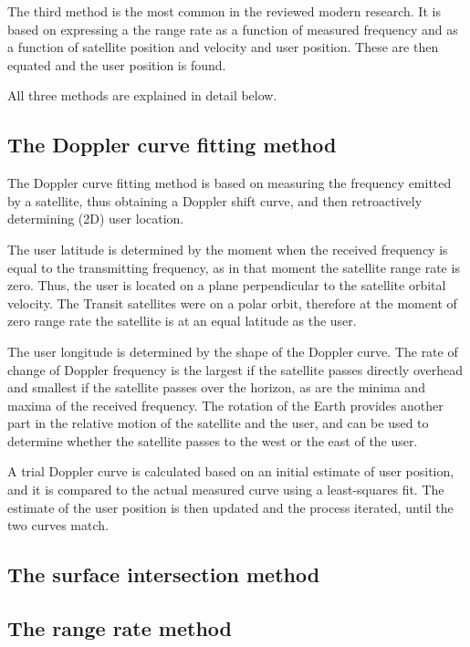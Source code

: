 The third method is the most common in the reviewed modern research. It is based on expressing a the range rate as a function of measured frequency and as a function of satellite position and velocity and user position. These are then equated and the user position is found\cite{sop02, sop13}.

All three methods are explained in detail below.

\subsection{The Doppler curve fitting method}
\label{s_transit_nav_method}
The Doppler curve fitting method is based on measuring the frequency emitted by a satellite, thus obtaining a Doppler shift curve, and then retroactively determining (2D) user location.

The user latitude is determined by the moment when the received frequency is equal to the transmitting frequency, as in that moment the satellite range rate is zero. Thus, the user is located on a plane perpendicular to the satellite orbital velocity. The Transit satellites were on a polar orbit, therefore at the moment of zero range rate the satellite is at an equal latitude as the user.

The user longitude is determined by the shape of the Doppler curve. The rate of change of Doppler frequency is the largest if the satellite passes directly overhead and smallest if the satellite passes over the horizon, as are the minima and maxima of the received frequency. The rotation of the Earth provides another part in the relative motion of the satellite and the user, and can be used to determine whether the satellite passes to the west or the east of the user.

A trial Doppler curve is calculated based on an initial estimate of user position, and it is compared to the actual measured curve using a least-squares fit. The estimate of the user position is then updated and the process iterated, until the two curves match\cite{sat16}.


\subsection{The surface intersection method}


\subsection{The range rate method}

